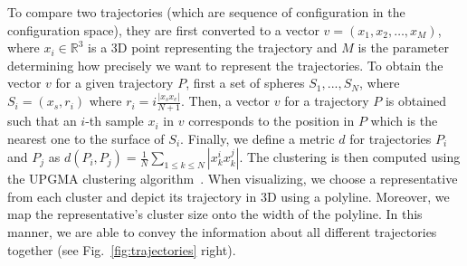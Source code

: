 \documentclass{svmult}
\def\R{\mathbb{R}}
\begin{document}
To compare two trajectories (which are sequence of configuration in the configuration space), they are first converted
to a vector $v=(x_1,x_2,\ldots,x_M)$, where $x_i \in \R^3$ is a 3D
point representing the trajectory and $M$ is the parameter determining how precisely we want to represent the trajectories.
To obtain the vector $v$ for a given trajectory $P$, first a set of spheres 
 $S_1, ..., S_N$, where $S_i = (x_s, r_i)$ where $r_i = i \frac{|x_s x_e|}{N + 1}$.
Then, a vector $v$ for a trajectory $P$ is obtained such that an $i$-th sample $x_i$ in $v$ corresponds to the position in $P$ which is the nearest one to the surface of $S_i$.
Finally, we define a metric $d$ for trajectories $P_i$ and $P_j$ as $d(P_i, P_j) = \frac{1}{N} \sum_{1 \leq k \leq N} |x_k^i x_k^j|$.
The clustering is then computed using the UPGMA clustering algorithm~\cite{sokal1958statistical}.
When visualizing, we choose a representative from each cluster and depict its trajectory in 3D using a polyline.
Moreover, we map the representative's cluster size onto the width of the polyline.
In this manner, we are able to convey the information about all different trajectories together (see Fig.~\ref{fig:trajectories} right).
\end{document}
